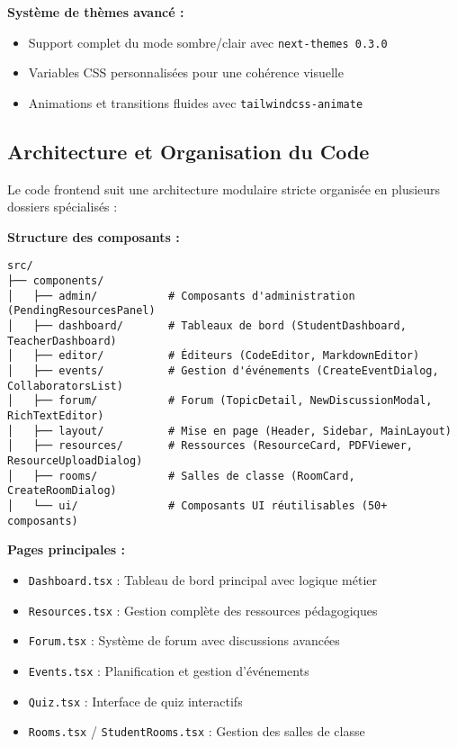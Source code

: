 \documentclass[12pt,a4paper]{article}
\begin{document}
\textbf{Système de thèmes avancé :}
\begin{itemize}
    \item Support complet du mode sombre/clair avec \texttt{next-themes 0.3.0}
    \item Variables CSS personnalisées pour une cohérence visuelle
    \item Animations et transitions fluides avec \texttt{tailwindcss-animate}
\end{itemize}

\subsection{Architecture et Organisation du Code}

Le code frontend suit une architecture modulaire stricte organisée en plusieurs dossiers spécialisés :

\textbf{Structure des composants :}
\begin{lstlisting}
src/
├── components/
│   ├── admin/           # Composants d'administration (PendingResourcesPanel)
│   ├── dashboard/       # Tableaux de bord (StudentDashboard, TeacherDashboard)
│   ├── editor/          # Éditeurs (CodeEditor, MarkdownEditor)
│   ├── events/          # Gestion d'événements (CreateEventDialog, CollaboratorsList)
│   ├── forum/           # Forum (TopicDetail, NewDiscussionModal, RichTextEditor)
│   ├── layout/          # Mise en page (Header, Sidebar, MainLayout)
│   ├── resources/       # Ressources (ResourceCard, PDFViewer, ResourceUploadDialog)
│   ├── rooms/           # Salles de classe (RoomCard, CreateRoomDialog)
│   └── ui/              # Composants UI réutilisables (50+ composants)
\end{lstlisting}

\textbf{Pages principales :}
\begin{itemize}
    \item \texttt{Dashboard.tsx} : Tableau de bord principal avec logique métier
    \item \texttt{Resources.tsx} : Gestion complète des ressources pédagogiques
    \item \texttt{Forum.tsx} : Système de forum avec discussions avancées
    \item \texttt{Events.tsx} : Planification et gestion d'événements
    \item \texttt{Quiz.tsx} : Interface de quiz interactifs
    \item \texttt{Rooms.tsx} / \texttt{StudentRooms.tsx} : Gestion des salles de classe
\end{itemize}
\end{document}
